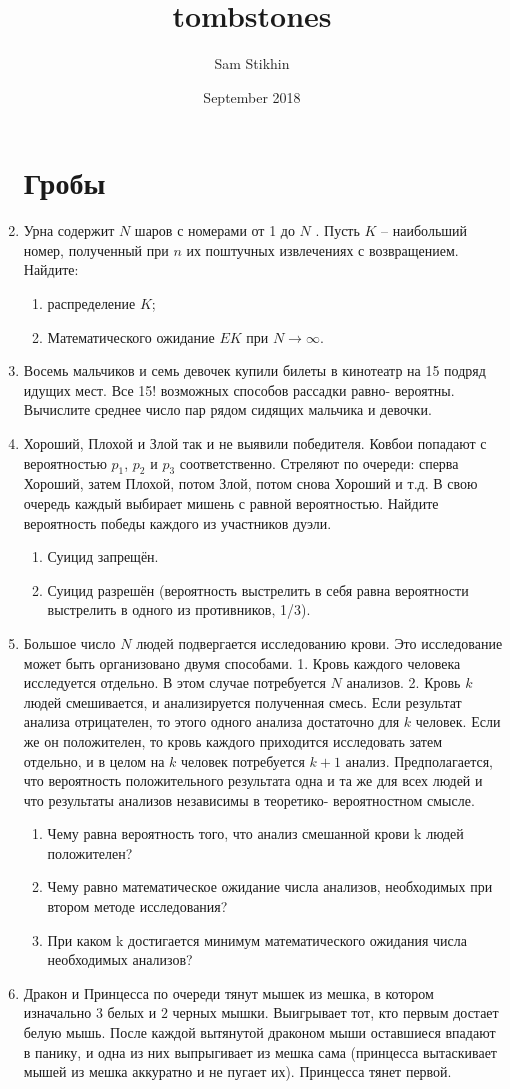 \documentclass[a4paper, 14pt]{extarticle}
\title{tombstones}
\author{Sam Stikhin}
\date{September 2018}
\begin{document}
\begin{enumerate}
\section*{Гробы}
	\item  Урна содержит $N$ шаров с номерами от 1 до $N$ . Пусть $K$ --
наибольший номер, полученный при $n$ их поштучных извлечениях с
возвращением. Найдите:	\begin{enumerate}
	\item  распределение $K$;
	\item Математического ожидание $EK$ при $N\rightarrow\infty$.
\end{enumerate}
    \item Восемь мальчиков и семь девочек купили билеты в кинотеатр на
	15 подряд идущих мест. Все 15! возможных способов рассадки равно-
	вероятны. Вычислите среднее число пар рядом сидящих мальчика и
	девочки.
\item Хороший, Плохой и Злой так и не выявили победителя. Ковбои попадают с вероятностью $p_1$, $p_2$ и $p_3$ соответственно. Стреляют по очереди: сперва Хороший, затем Плохой, потом Злой, потом снова Хороший и т.д. В свою очередь каждый выбирает мишень с равной вероятностью. Найдите вероятность победы каждого из участников дуэли.
\begin{enumerate}
    \item Суицид запрещён.
    \item Суицид разрешён (вероятность выстрелить в себя равна вероятности выстрелить в одного из противников, 1/3).
\end{enumerate}
\item  Большое число $N$ людей подвергается исследованию
	крови. Это исследование может быть организовано двумя
	способами. 1. Кровь каждого человека исследуется отдельно.
	В этом случае потребуется $N$ анализов. 2. Кровь $k$ людей
	смешивается, и анализируется полученная смесь. Если  
	результат анализа отрицателен, то этого одного анализа  
	достаточно для $k$ человек. Если же он положителен, то кровь  
	каждого приходится исследовать затем отдельно, и в целом на $k$
	человек потребуется $k+1$ анализ. Предполагается, что  
	вероятность положительного результата одна и та же для всех
	людей и что результаты анализов независимы в теоретико-
	вероятностном смысле.
	\begin{enumerate}
		\item Чему равна вероятность того, что анализ смешанной
	крови k людей положителен?
	\item Чему равно математическое ожидание числа анализов, необходимых при
	втором методе исследования?
	\item При каком k достигается минимум математического ожидания числа  
	необходимых анализов?
	\end{enumerate}
 \item Дракон и Принцесса по очереди тянут мышек из мешка, в котором изначально $3$ белых и $2$ черных мышки. Выигрывает тот, кто первым достает белую мышь. После каждой вытянутой драконом мыши оставшиеся впадают в панику, и одна из них выпрыгивает из мешка сама (принцесса вытаскивает мышей из мешка аккуратно и не пугает их). Принцесса тянет первой.


\end{enumerate}
\end{document}

